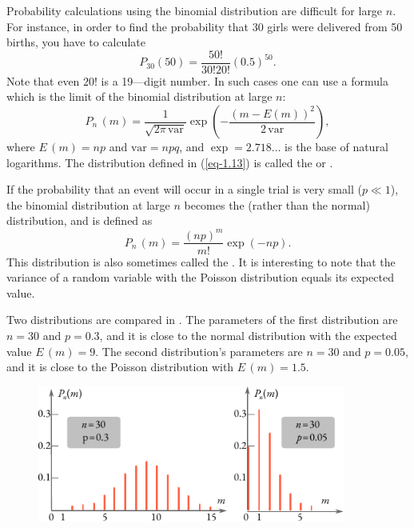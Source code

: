  Probability calculations using the
binomial distribution are difficult for large $n$. For instance, in order to
find the probability that 30 girls were delivered from 50 births, you have
to calculate
\begin{equation*}
P_{30}(50) = \frac{50!}{30!20!} (0.5)^{50}.
\end{equation*}
Note that even $20!$ is a 19—digit number. In such cases one can use a
formula which is the limit of the binomial distribution at large $n$:
\begin{equation}%
P_{n}\,(m) = \frac{1}{\sqrt{2 \pi \, \textrm{var}}} \exp \left( -  \frac{(m - E(m))^{2}}{2 \, \textrm{var}}  \right),
\label{eq-1.13}
\end{equation}
where $E\,(m) = np$ and $\textrm{var} = npq$, and $\exp = 2.718 \ldots$
is the base of natural logarithms. The distribution deﬁned in
(\ref{eq-1.13}) is called the  or .


 If the probability that an event will
occur in a single trial is very small ($p \ll1$), the binomial distribution at
large $n$  becomes the  (rather than the normal) distribution, and is deﬁned as
\begin{equation}%
P_{n}\,(m) = \frac{(np)^{m}}{m!} \exp (-np).
\label{eq-1.14}
\end{equation}
This distribution is also sometimes called the . It is
interesting to note that the variance of a random variable with
the Poisson distribution equals its expected value.

Two distributions are compared in . The parameters of the
first distribution are $n = 30$ and $p = 0.3$, and it is close to the normal
distribution with the expected value $E\, (m) = 9$. The second distribution’s
parameters are $n = 30$ and $p = 0.05$, and it is close to the Poisson
distribution with $E\,(m)= 1.5$.

\begin{figure}[!h]
 \centering
 \includegraphics[width=0.9\textwidth]{figures/poisson-gaussian.pdf}
 \end{figure}

